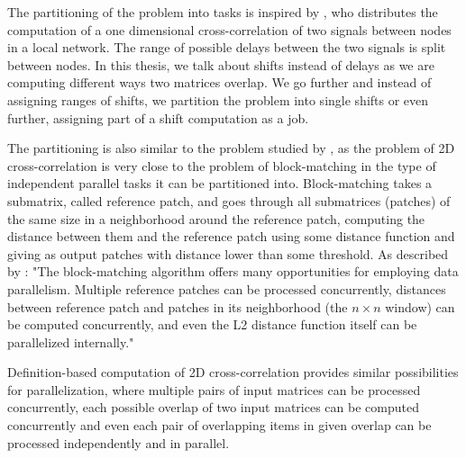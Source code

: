 
The partitioning of the problem into tasks is inspired by \citet{paper:cross_corr_tasks}, who distributes the computation of a one dimensional cross-correlation of two signals between nodes in a local network. The range of possible delays between the two signals is split between nodes. In this thesis, we talk about shifts instead of delays as we are computing different ways two matrices overlap. We go further and instead of assigning ranges of shifts, we partition the problem into single shifts or even further, assigning part of a shift computation as a job.


The partitioning is also similar to the problem studied by \citet{paper:krulis_3d_block}, as the problem of 2D cross-correlation is very close to the problem of block-matching in the type of independent parallel tasks it can be partitioned into. Block-matching takes a submatrix, called reference patch, and goes through all submatrices (patches) of the same size in a neighborhood around the reference patch, computing the distance between them and the reference patch using some distance function and giving as output patches with distance lower than some threshold. As described by \citet{paper:krulis_3d_block}: "The block-matching algorithm offers many opportunities
for employing data parallelism. Multiple reference patches
can be processed concurrently, distances between reference
patch and patches in its neighborhood (the $n \times n$ window)
can be computed concurrently, and even the L2 distance
function itself can be parallelized internally."

Definition-based computation of 2D cross-correlation provides similar possibilities for parallelization, where multiple pairs of input matrices can be processed concurrently, each possible overlap of two input matrices can be computed concurrently and even each pair of overlapping items in given overlap can be processed independently and in parallel. 

